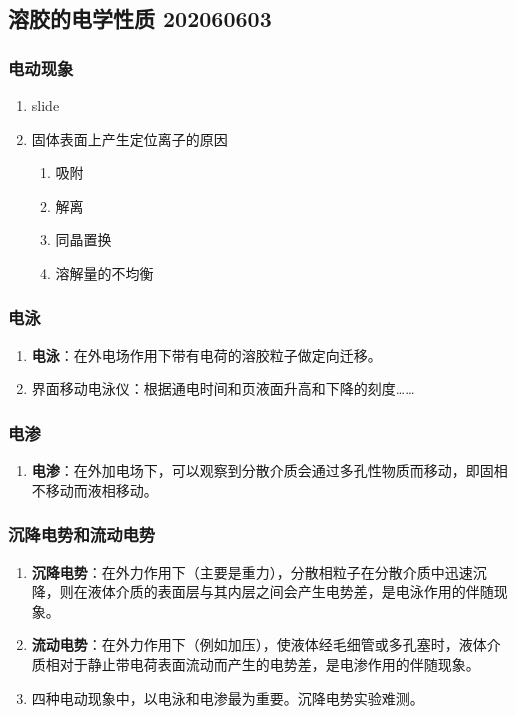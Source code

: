 \subsection{溶胶的电学性质 202060603}

\subsubsection{电动现象}

\begin{enumerate}
    \item slide
    \item 固体表面上产生定位离子的原因
    \begin{enumerate}
        \item 吸附
        \item 解离
        \item 同晶置换
        \item 溶解量的不均衡
    \end{enumerate}
\end{enumerate}

\subsubsection{电泳}

\begin{enumerate}
    \item \textbf{电泳}：在外电场作用下带有电荷的溶胶粒子做定向迁移。
    \item 界面移动电泳仪：根据通电时间和页液面升高和下降的刻度……
\end{enumerate}

\subsubsection{电渗}

\begin{enumerate}
    \item \textbf{电渗}：在外加电场下，可以观察到分散介质会通过多孔性物质而移动，即固相不移动而液相移动。
\end{enumerate}

\subsubsection{沉降电势和流动电势}

\begin{enumerate}
    \item \textbf{沉降电势}：在外力作用下（主要是重力），分散相粒子在分散介质中迅速沉降，则在液体介质的表面层与其内层之间会产生电势差，是电泳作用的伴随现象。
    \item \textbf{流动电势}：在外力作用下（例如加压），使液体经毛细管或多孔塞时，液体介质相对于静止带电荷表面流动而产生的电势差，是电渗作用的伴随现象。
    \item 四种电动现象中，以电泳和电渗最为重要。沉降电势实验难测。
\end{enumerate}

